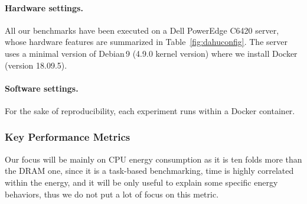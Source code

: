 \paragraph{Hardware settings.}
All our benchmarks have been executed on a Dell PowerEdge C6420 server, whose hardware features are summarized in Table~\ref{fig:dahuconfig}.
The server uses a minimal version of Debian\,9 (4.9.0 kernel version) where we install Docker (version 18.09.5).

\begin{table}[hbt]
      \caption{Benchmarking server configuration.}
      \label{fig:dahuconfig}
\end{table}

\paragraph{Software settings.}
For the sake of reproducibility, each experiment runs within a Docker container.
\subsubsection{Key Performance Metrics}
Our focus will be mainly on CPU energy consumption as it is ten folds more than the DRAM one, since it is a task-based benchmarking, time is highly correlated within the energy, and it will be only useful to explain some specific energy behaviors, thus we do not put a lot of focus on this metric.


